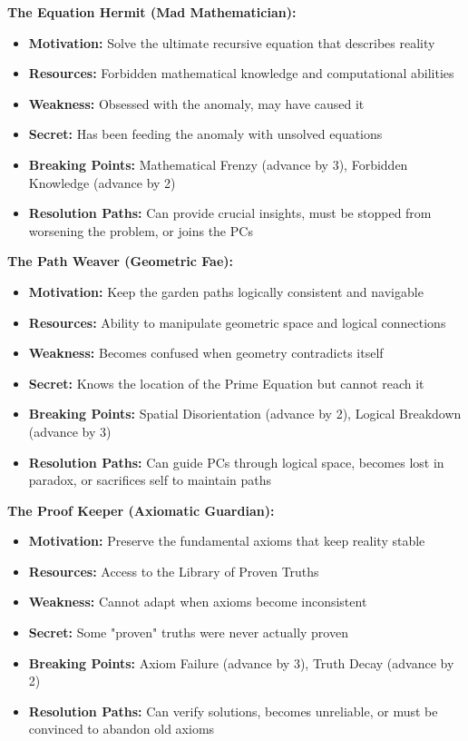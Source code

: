 \documentclass[11pt]{article}
\begin{document}
\textbf{The Equation Hermit (Mad Mathematician):}
\begin{itemize}
    \item \textbf{Motivation:} Solve the ultimate recursive equation that describes reality
    \item \textbf{Resources:} Forbidden mathematical knowledge and computational abilities
    \item \textbf{Weakness:} Obsessed with the anomaly, may have caused it
    \item \textbf{Secret:} Has been feeding the anomaly with unsolved equations
    \item \textbf{Breaking Points:} Mathematical Frenzy (advance by 3), Forbidden Knowledge (advance by 2)
    \item \textbf{Resolution Paths:} Can provide crucial insights, must be stopped from worsening the problem, or joins the PCs
\end{itemize}

\textbf{The Path Weaver (Geometric Fae):}
\begin{itemize}
    \item \textbf{Motivation:} Keep the garden paths logically consistent and navigable
    \item \textbf{Resources:} Ability to manipulate geometric space and logical connections
    \item \textbf{Weakness:} Becomes confused when geometry contradicts itself
    \item \textbf{Secret:} Knows the location of the Prime Equation but cannot reach it
    \item \textbf{Breaking Points:} Spatial Disorientation (advance by 2), Logical Breakdown (advance by 3)
    \item \textbf{Resolution Paths:} Can guide PCs through logical space, becomes lost in paradox, or sacrifices self to maintain paths
\end{itemize}

\textbf{The Proof Keeper (Axiomatic Guardian):}
\begin{itemize}
    \item \textbf{Motivation:} Preserve the fundamental axioms that keep reality stable
    \item \textbf{Resources:} Access to the Library of Proven Truths
    \item \textbf{Weakness:} Cannot adapt when axioms become inconsistent
    \item \textbf{Secret:} Some "proven" truths were never actually proven
    \item \textbf{Breaking Points:} Axiom Failure (advance by 3), Truth Decay (advance by 2)
    \item \textbf{Resolution Paths:} Can verify solutions, becomes unreliable, or must be convinced to abandon old axioms
\end{itemize}
\end{document}

